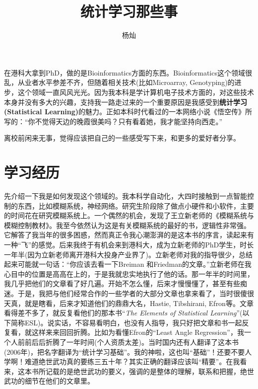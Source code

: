 \documentclass{cosart-xetex}
\begin{document}
\setlength{\parskip}{1.1ex}
\setlength{\baselineskip}{1.7em}
\renewcommand\thefootnote{\fnsymbol{footnote}}  %
\title{统计学习那些事} %
\author{杨灿} %
\maketitle
\thispagestyle{empty}

\renewcommand\thefootnote{\arabic{footnote}} 
在港科大拿到PhD，做的是Bioinformatics方面的东西。Bioinformatics这个领域很乱，从业者水平参差不齐，但随着相关技术(比如Microarray, Genotyping)的进步，这个领域一直风风光光。因为我本科是学计算机电子技术方面的，对这些技术本身并没有多大的兴趣，支持我一路走过来的一个重要原因是我感受到\textbf{统计学习(Statistical Learning)}的魅力。正如本科时代看过的一本网络小说《悟空传》所写的：“你不觉得天边的晚霞很美吗？只有看着她，我才能坚持向西走。”

离校前闲来无事，觉得应该把自己的一些感受写下来，和更多的爱好者分享。
\section{学习经历}

先介绍一下我是如何发现这个领域的。我本科学自动化，大四时接触到一点智能控制的东西，比如模糊系统，神经网络。研究生阶段除了做点小硬件和小软件，主要的时间花在研究模糊系统上。一个偶然的机会，发现了王立新老师的《模糊系统与模糊控制教材》。我至今依然认为这是有关模糊系统的最好的书，逻辑性非常强。它解答了我当年的很多困惑，然而真正令我心潮澎湃的是这本书的序言，读起来有一种“飞”的感觉。后来我终于有机会来到港科大，成为立新老师的PhD学生，时长一年半(因为立新老师离开港科大投身产业界了)。立新老师对我的指导很少，总结起来可能就一句话：“你应该去看一下Breiman 和Friedman的文章。”立新老师在我心目中的位置是高高在上的，于是我就忠实地执行了他的话。那一年半的时间里，我几乎把他们的文章看了好几遍。开始不怎么懂，后来才慢慢懂了，甚至有些痴迷。于是，我把与他们经常合作的一些学者的大部分文章也拿来看了，当时很傻很天真，就是瞎看，后来才知道他们的鼎鼎大名，Hastie, Tibshirani, Efron等。文章看得差不多了，就反复看他们的那本书“\textit{The Elements of Statistical Learning}”(以下简称ESL)。说实话，不容易看明白，也没有人指导，我只好把文章和书一起反复看，就这样来来回回折腾。比如为看懂Efron的“Least Angle Regression”，我一个人前前后后折腾了一年时间(个人资质太差)。当时国内还有人翻译了这本书(2006年)，把名字翻译为“统计学习基础”。我的神啦，这也叫“基础”！还要不要人学啊！难道绝世武功真的要练三五十年？其实正确的翻译应该叫“精要”。在我看来，这本书所记载的是绝世武功的要义，强调的是整体的理解，联系和把握，绝世武功的细节在他们的文章里。
\end{document}
